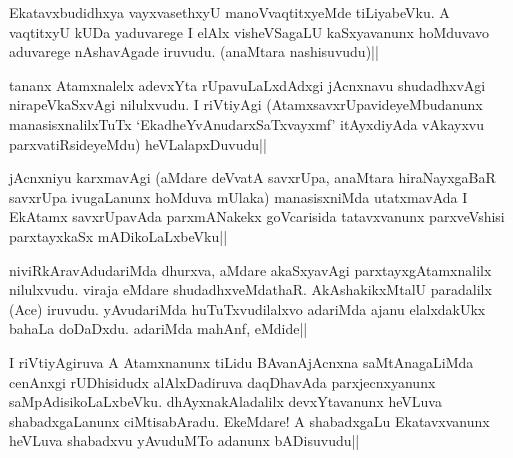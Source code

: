 
\begin{artha} 
Ekatavxbudidhxya vayxvasethxyU manoVvaqtitxyeMde tiLiyabeVku. A 
vaqtitxyU kUDa yaduvarege I elAlx visheVSagaLU kaSxyavanunx hoMduvavo 
aduvarege nAshavAgade iruvudu. (anaMtara nashisuvudu)||
\end{artha}


\begin{artha} 
tananx Atamxnalelx adevxYta rUpavuLaLxdAdxgi jAcnxnavu shudadhxvAgi 
nirapeVkaSxvAgi nilulxvudu. I riVtiyAgi (AtamxsavxrUpavideyeMbudanunx 
manasisxnalilxTuTx `EkadheYvAnudarxSaTxvayxmf' itAyxdiyAda vAkayxvu 
parxvatiRsideyeMdu) heVLalapxDuvudu||
\end{artha}


\begin{artha} 
jAcnxniyu karxmavAgi (aMdare deVvatA savxrUpa, anaMtara hiraNayxgaBaR 
savxrUpa ivugaLanunx hoMduva mUlaka) manasisxniMda utatxmavAda I 
EkAtamx savxrUpavAda parxmANakekx goVcarisida tatavxvanunx 
parxveVshisi parxtayxkaSx mADikoLaLxbeVku||
\end{artha}


\begin{artha} 
niviRkAravAdudariMda dhurxva, aMdare akaSxyavAgi parxtayxgAtamxnalilx 
nilulxvudu. viraja eMdare shudadhxveMdathaR. AkAshakikxMtalU 
paradalilx (Ace) iruvudu. yAvudariMda huTuTxvudilalxvo adariMda ajanu 
elalxdakUkx bahaLa doDaDxdu. adariMda mahAnf, eMdide||
\end{artha}


\begin{artha} 
I riVtiyAgiruva A Atamxnanunx tiLidu BAvanAjAcnxna saMtAnagaLiMda 
cenAnxgi rUDhisidudx alAlxDadiruva daqDhavAda parxjecnxyanunx 
saMpAdisikoLaLxbeVku. dhAyxnakAladalilx devxYtavanunx heVLuva 
shabadxgaLanunx ciMtisabAradu. EkeMdare! A shabadxgaLu Ekatavxvanunx 
heVLuva shabadxvu yAvuduMTo adanunx bADisuvudu||
\end{artha}


